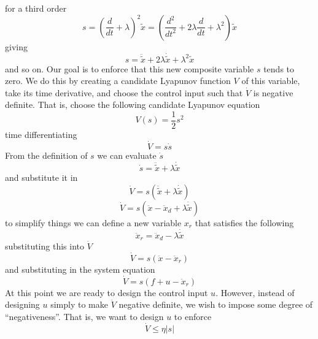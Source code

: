 for a third order
\begin{equation*}
  s=\left(\frac{d}{dt}+\lambda\right)^{2}\tilde{x}=\left(\frac{d^{2}}{dt^{2}}+2\lambda\frac{d}{dt}+\lambda^{2}\right)\tilde{x}
\end{equation*}
giving
\begin{equation*}
  s=\ddot{\tilde{x}}+2\lambda\dot{\tilde{x}}+\lambda^{2}\tilde{x}
\end{equation*}
and so on.
Our goal is to enforce that this new composite variable $s$ tends to zero.
We do this by creating a candidate Lyapunov function $V$ of this variable, take its time derivative, and choose the control input such that $\dot{V}$ is negative definite.
That is, choose the following candidate Lyapunov equation
\begin{equation*}
  V(s)=\frac{1}{2}s^{2}
\end{equation*}
time differentiating
\begin{equation*}
  \dot{V}=s\dot{s}
\end{equation*}
From the definition of $s$ we can evaluate $\dot{s}$
\begin{equation*}
  \dot{s}=\ddot{\tilde{x}}+\lambda\dot{\tilde{x}}
\end{equation*}
and substitute it in
\begin{equation*}
  \dot{V}=s(\ddot{\tilde{x}}+\lambda\dot{\tilde{x}})
\end{equation*}
\begin{equation*}
  \dot{V}=s(\ddot{x}-\ddot{x}_{d}+\lambda\dot{\tilde{x}})
\end{equation*}
to simplify things we can define a new variable $x_{r}$ that satisfies the following
\begin{equation*}
  \ddot{x}_{r}=\ddot{x}_{d}-\lambda\dot{\tilde{x}}
\end{equation*}
substituting this into $\dot{V}$
\begin{equation*}
  \dot{V}=s(\ddot{x}-\ddot{x}_{r})
\end{equation*}
and substituting in the system equation
\begin{equation*}
  \dot{V}=s(f+u-\ddot{x}_{r})
\end{equation*}
At this point we are ready to design the control input $u$.
However, instead of designing $u$ simply to make $\dot{V}$ negative definite, we wish to impose some degree of ``negativeness''.
That is, we want to design $u$ to enforce
\begin{equation*}
  \dot{V}\leq\eta|s|
\end{equation*}
